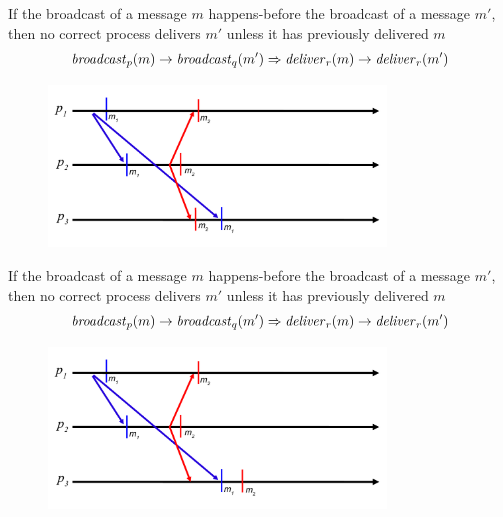 \begin{frame}

\begin{definition}
If the broadcast of a message $m$ \alert{happens-before} the broadcast of a message $m'$, then 
no correct process delivers $m'$ unless it has previously delivered $m$
\[
  \mathit{broadcast}_p(m) \rightarrow \mathit{broadcast}_q(m') \Rightarrow \mathit{deliver}_r(m) \rightarrow \mathit{deliver}_r(m')
\]
\end{definition}

 

\begin{figure}
\includegraphics[width=0.8\textwidth]{rb-causal2}
\end{figure}
		
\end{frame}

\begin{frame}

\begin{definition}
If the broadcast of a message $m$ \alert{happens-before} the broadcast of a message $m'$, then 
no correct process delivers $m'$ unless it has previously delivered $m$
\[
  \mathit{broadcast}_p(m) \rightarrow \mathit{broadcast}_q(m') \Rightarrow \mathit{deliver}_r(m) \rightarrow \mathit{deliver}_r(m')
\]
\end{definition}

 

\begin{figure}
\includegraphics[width=0.8\textwidth]{rb-causal3}
\end{figure}
		
\end{frame}

